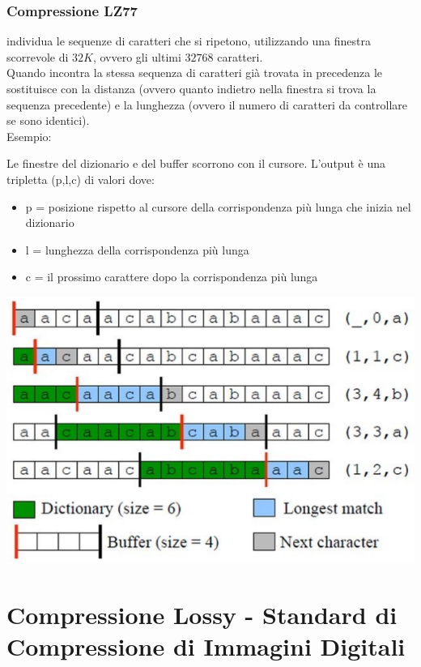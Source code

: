 \documentclass[a4paper,11pt]{article} %
\begin{document}
\subsubsection{Compressione LZ77}
individua le sequenze di caratteri che si ripetono, utilizzando una finestra scorrevole di $32K$, ovvero gli ultimi $32768$ caratteri.\\
Quando incontra la stessa sequenza di caratteri già trovata in precedenza le sostituisce con la distanza (ovvero quanto indietro nella finestra si trova la sequenza precedente) e la lunghezza (ovvero il numero di caratteri da controllare se sono identici).\\
Esempio:\\
\begin{minipage}{0.48\textwidth}
Le finestre del dizionario e del buffer scorrono con il cursore. L'output è una tripletta (p,l,c) di valori dove: 
\begin{itemize}
\item p = posizione rispetto al cursore della corrispondenza più lunga che inizia nel dizionario
\item l = lunghezza della corrispondenza più lunga
\item c = il prossimo carattere dopo la corrispondenza più lunga
\end{itemize}
\end{minipage}
\hspace{0.02\textwidth}
\begin{minipage}{0.50\textwidth}
\centering
    \includegraphics[width=\linewidth]{LZ77 example.png}
\end{minipage}

\newpage

\section{Compressione Lossy - Standard di Compressione di Immagini Digitali}
\end{document}
